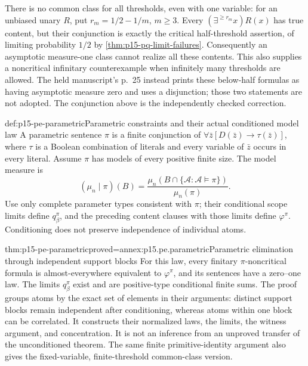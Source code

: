 There is no common class for all thresholds, even with one variable:
for an unbiased unary \(R\), put \(r_m=1/2-1/m\), \(m\ge3\).
Every \((\exists^{\ge r_m}x)R(x)\) has true content, but their
conjunction is exactly the critical half-threshold assertion, of limiting
probability \(1/2\) by \cref{thm:p15-pq-limit-failures}.
Consequently an asymptotic measure-one class cannot realize all these
contents. This also supplies a noncritical infinitary counterexample
when infinitely many thresholds are allowed. The held manuscript's
p.~25 instead prints these below-half formulas as having asymptotic
measure zero and uses a disjunction; those two statements are not
adopted. The conjunction above is the independently checked correction.

\begin{hbdefinition}{def:p15-pe-parametric}{Parametric constraints and their actual conditioned model law}
A parametric sentence \(\pi\) is a finite conjunction of
\(\forall\bar z[D(\bar z)\to\tau(\bar z)]\), where \(\tau\) is a
Boolean combination of literals and every variable of \(\bar z\)
occurs in every literal. Assume \(\pi\) has models of every positive
finite size. The model measure is
\[
  (\mu_n\mid\pi)(B)=
            \frac{\mu_n(B\cap\{\mathcal A:\mathcal A\models\pi\})}
                 {\mu_n(\pi)}.
\]
Use only complete parameter types consistent with \(\pi\); their
conditional scope limits define \(q_\beta^\pi\), and the preceding
content clauses with those limits define \(\varphi^\pi\).
Conditioning does not preserve independence of individual atoms.
\end{hbdefinition}

\begin{hbtheorem}{thm:p15-pe-parametric}{proved=annex:p15.pe.parametric}{Parametric elimination through independent support blocks}
For this law, every finitary \(\pi\)-noncritical formula is
almost-everywhere equivalent to \(\varphi^\pi\), and its sentences have
a zero--one law. The limits \(q_\beta^\pi\) exist and are positive-type
conditional finite sums. The proof groups atoms by the exact set of
elements in their arguments: distinct support blocks remain independent
after conditioning, whereas atoms within one block can be correlated.
It constructs their normalized laws, the limits, the witness argument,
and concentration. It is not an inference from an unproved transfer of
the unconditioned theorem. The same finite primitive-identity argument
also gives the fixed-variable, finite-threshold common-class version.
\end{hbtheorem}

